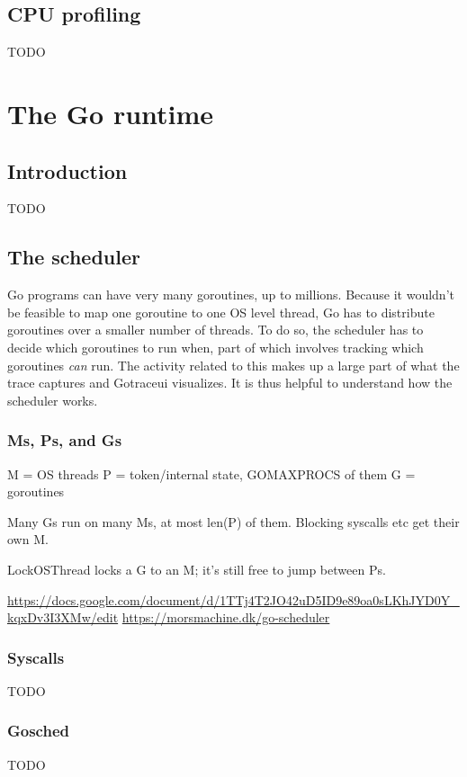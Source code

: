 \documentclass[10pt,letterpaper,oneside,openany,showtrims]{memoir}
\newcommand{\todo}[1]{{\color{red}#1}}
\begin{document}
\section{CPU profiling}
\todo{TODO}

\chapter{The Go runtime}


\section{Introduction}
\todo{TODO}

\section{The scheduler}
Go programs can have very many goroutines, up to millions.
Because it wouldn't be feasible to map one goroutine to one OS level thread,
Go has to distribute goroutines over a smaller number of threads.
To do so, the scheduler has to decide which goroutines to run when,
part of which involves tracking which goroutines {\em can} run.
The activity related to this makes up a large part of what the trace captures and Gotraceui visualizes.
It is thus helpful to understand how the scheduler works.

\subsection{Ms, Ps, and Gs}
\todo{
  M = OS threads
  P = token/internal state, GOMAXPROCS of them
  G = goroutines

  Many Gs run on many Ms, at most len(P) of them. Blocking syscalls etc get their own M.

  LockOSThread locks a G to an M; it's still free to jump between Ps.

  \url{https://docs.google.com/document/d/1TTj4T2JO42uD5ID9e89oa0sLKhJYD0Y_kqxDv3I3XMw/edit}
  \url{https://morsmachine.dk/go-scheduler}
}

\subsection{Syscalls}\label{syscalls}
\todo{TODO}

\subsection{Gosched}
\todo{TODO}
\end{document}
